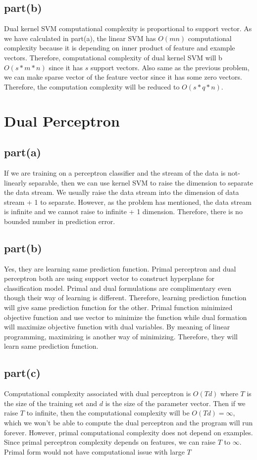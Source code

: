 \documentclass{article}
\begin{document}
\subsection{part(b)}
Dual kernel SVM computational complexity is proportional to support vector. As we have calculated in part(a), the linear SVM has $O(mn)$ computational complexity because it is depending on inner product of feature and example vectors. Therefore, computational complexity of dual kernel SVM will b $O(s*m*n)$ since it has $s$ support vectors. Also same as the previous problem, we can make sparse vector of the feature vector since it has some zero vectors. Therefore, the computation complexity will be reduced to $O(s*q*n)$.
\newpage
\section{Dual Perceptron} 
\subsection{part(a)}
If we are training on a perceptron classifier and the stream of the data is not-linearly separable, then we can use kernel SVM to raise the dimension to separate the data stream. We usually raise the data stream into the dimension of data stream + 1 to separate. However, as the problem has mentioned, the data stream is infinite and we cannot raise to infinite + 1 dimension. Therefore, there is no bounded number in prediction error.
\subsection{part(b)}
Yes, they are learning same prediction function. Primal perceptron and dual perceptron both are using support vector to construct hyperplane for classification model. Primal and dual formulations are complimentary even though their way of learning is different. Therefore, learning prediction function will give same prediction function for the other. Primal function minimized objective function and use vector to minimize the function while dual formation will maximize objective function with dual variables. By meaning of linear programming, maximizing is another way of minimizing. Therefore, they will learn same prediction function. 
\subsection{part(c)}
Computational complexity associated with dual perceptron is $O(Td)$ where $T$ is the size of the training set and $d$ is the size of the parameter vector. Then if we raise $T$ to infinite, then the computational complexity will be $O(Td) = \infty$, which we won't be able to compute the dual perceptron and the program will run forever. However, primal computational complexity does not depend on examples. Since primal perceptron complexity depends on features, we can raise $T$ to $\infty$. Primal form would not have computational issue with large $T$
\newpage
\end{document}
